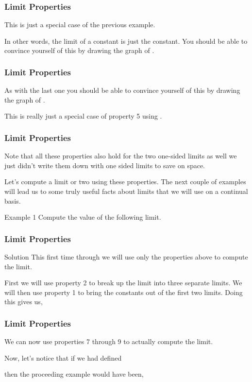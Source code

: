\documentclass{beamer}
\begin{document}
\begin{frame}[fragile]
	\frametitle{Limit Properties}
	\Large
This is just a special case of the previous example.
                                            
 

In other words, the limit of a constant is just the constant.  You should be able to convince yourself of this by drawing the graph of .
 
\end{frame}
\begin{frame}[fragile]
	\frametitle{Limit Properties}
	\Large
As with the last one you should be able to convince yourself of this by drawing the graph of .
 

This is really just a special case of property 5 using .
\end{frame}
\begin{frame}[fragile]
	\frametitle{Limit Properties}
	\Large
Note that all these properties also hold for the two one-sided limits as well we just didn’t write them down with one sided limits to save on space.
 
Let’s compute a limit or two using these properties.  The next couple of examples will lead us to some truly useful facts about limits that we will use on a continual basis.
 
Example 1  Compute the value of the following limit.
\end{frame}
\begin{frame}[fragile]
	\frametitle{Limit Properties}
	\Large
Solution
This first time through we will use only the properties above to compute the limit.
 
First we will use property 2 to break up the limit into three separate limits.  We will then use property 1 to bring the constants out of the first two limits.  Doing this gives us,

\end{frame}
\begin{frame}[fragile]
	\frametitle{Limit Properties}
	\Large
We can now use properties 7 through 9 to actually compute the limit.

 
Now, let’s notice that if we had defined

then the proceeding example would have been,
\end{frame}
\end{document}
